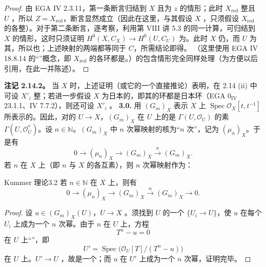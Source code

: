 \begin{proof}
由 EGA IV 2.3.11，第一条断言归结到 $X$ 且为 $z$ 的情形；此时 $X_{\mathrm{red}}$ 整且 $U$ ，所以 $Z=X_{\mathrm{red}}$，断言显然成立（因此在这里，与其假设 $X$ ，只须假设 $X_{\mathrm{red}}$ 的各整）。对于第二条断言，逐考察，利用第 VIII 讲 5.3 的同一计算，可归结到 $X$ 的情形，这时只须证明 $H^0(X,C_X)\to H^0(U,C_U)$ 为。此时 $X$ 仍，而 $U$ 为其，所以也；上述映射的两端都等同于 $C$，所需结论即得。
（这里使用 EGA IV 18.8.14 的“”概念，即 $X_{\mathrm{red}}$ 的各环都是。）的包含情形完全同样处理（为方便以后引用，在此一并陈述）。
\end{proof}
\textbf{注记 2.14.2。} 当 $X$ 时，上述证明（或它的一个直接推论）表明，在 2.14 (ii) 中可设 $X'_i$ 整；若进一步假设 $X$ 为日本的，即其的环都是日本环（EGA $0_{\mathrm{IV}}$ 23.1.1、IV 7.7.2），则还可设 $X'_i$ 。
\textbf{3.0.} 用 $(G_m)_X$ 表示 $X$ 上 $\operatorname{Spec}\mathcal O_X[t,t^{-1}]$ 所表示的。因此，对的 $U\to X$，$(G_m)_X$ 在 $U$ 上的是 $\Gamma(U,\mathcal O_U)$ 的素 $\Gamma(U,\mathcal O_U^*)$。设 $n\in\mathbb N$。$(G_m)_X$ 中 $n$ 次幂映射的核为“$n$ 次”，记为 $(\mu_n)_X$。于是有
\[
0\longrightarrow(\mu_n)_X\longrightarrow(G_m)_X\xrightarrow{n}(G_m)_X.
\tag{3.1}
\]
若 $n$ 在 $X$ 上（即 $n$ 与 $X$ 的各互素），则 $n$ 次幂映射作为：
\begin{SGAresult}{Kummer 理论}{3.2}
若 $n\in\mathbb N$ 在 $X$ 上，则有
\[
0\longrightarrow(\mu_n)_X\longrightarrow(G_m)_X\xrightarrow{n}(G_m)_X\longrightarrow0.
\]
\end{SGAresult}
\begin{proof}
设 $u\in(G_m)_X(U)$，$U\to X$ 。须找到 $U$ 的一个 $\{U_i\to U\}$，使 $u$ 在每个 $U_i$ 上成为一个 $n$ 次幂。由于 $n$ 在 $U$ 上，方程
\[
T^n-u=0
\]
在 $U$ 上“”，即
\[
U'=\operatorname{Spec}\bigl(\mathcal O_U[T]/(T^n-u)\bigr)
\]
在 $U$ 上。$U'\to U$ ，故是一个；而 $u$ 在 $U'$ 上成为一个 $n$ 次幂，证明完毕。
\end{proof}
